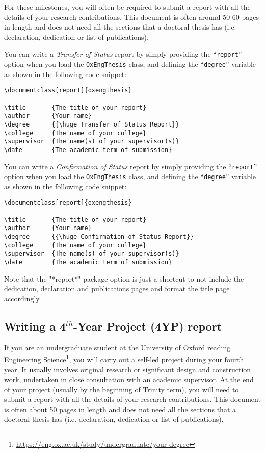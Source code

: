 For these milestones, you will often be required to submit a report 
with all the details of your research contributions. This document is often 
around 50-60 pages in length and does not need all the sections that a doctoral
thesis has (i.e. declaration, dedication or list of publications). 

You can write a \textit{Transfer of Status} report by simply providing the ``\verb|report|'' 
option when you load the \verb|OxEngThesis| class, and defining the ``\verb|degree|'' variable
as shown in the following code snippet:


\begin{lstlisting}[style=custom-latex]
\documentclass[report]{oxengthesis}

\title       {The title of your report}
\author      {Your name}
\degree      {{\huge Transfer of Status Report}}
\college     {The name of your college}
\supervisor  {The name(s) of your supervisor(s)}
\date        {The academic term of submission}
\end{lstlisting}


You can write a \textit{Confirmation of Status} report by simply providing the ``\verb|report|'' 
option when you load the \verb|OxEngThesis| class, and defining the ``\verb|degree|'' variable
as shown in the following code snippet:


\begin{lstlisting}[style=custom-latex]
\documentclass[report]{oxengthesis}

\title       {The title of your report}
\author      {Your name}
\degree      {{\huge Confirmation of Status Report}}
\college     {The name of your college}
\supervisor  {The name(s) of your supervisor(s)}
\date        {The academic term of submission}
\end{lstlisting}

Note that the "*report*" package option is just a shortcut to not include the
dedication, declaration and publications pages and format the title page 
accordingly.



\subsection{Writing a 4$^{th}$-Year Project (4YP) report}


If you are an undergraduate student at the University of Oxford reading Engineering Science\footnote{\url{https://eng.ox.ac.uk/study/undergraduate/your-degree}}, you will carry out a self-led project during your fourth year. It usually involves original research or significant design and construction work, undertaken in close consultation with an academic supervisor. At the end of your project (usually by the beginning of Trinity term), you will need to submit a report with all the details of your research contributions. This document is often about 50 pages in length and does not need all the sections that a doctoral thesis has (i.e. declaration, dedication or list of publications). 

